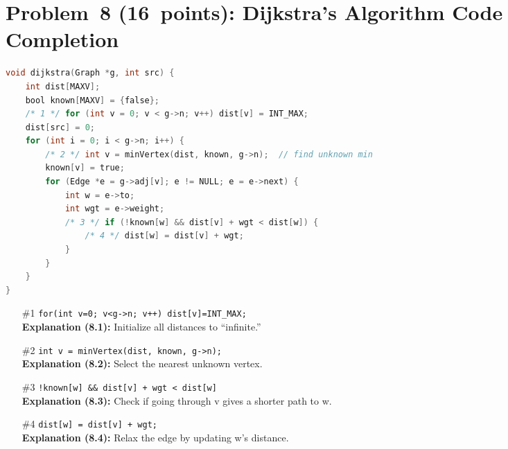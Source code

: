 \documentclass[12pt]{article}
\begin{document}
\section*{Problem 8 (16 points): Dijkstra's Algorithm Code Completion}
\begin{lstlisting}[language=C]
void dijkstra(Graph *g, int src) {
    int dist[MAXV];
    bool known[MAXV] = {false};
    /* 1 */ for (int v = 0; v < g->n; v++) dist[v] = INT_MAX;
    dist[src] = 0;
    for (int i = 0; i < g->n; i++) {
        /* 2 */ int v = minVertex(dist, known, g->n);  // find unknown min
        known[v] = true;
        for (Edge *e = g->adj[v]; e != NULL; e = e->next) {
            int w = e->to;
            int wgt = e->weight;
            /* 3 */ if (!known[w] && dist[v] + wgt < dist[w]) {
                /* 4 */ dist[w] = dist[v] + wgt;
            }
        }
    }
}
\end{lstlisting}
\begin{itemize}
  \item[\#1] \verb|for(int v=0; v<g->n; v++) dist[v]=INT_MAX;|  
    \\ \textbf{Explanation (8.1):} Initialize all distances to “infinite.”
  \item[\#2] \verb|int v = minVertex(dist, known, g->n);|  
    \\ \textbf{Explanation (8.2):} Select the nearest unknown vertex.
  \item[\#3] \verb|!known[w] && dist[v] + wgt < dist[w]|  
    \\ \textbf{Explanation (8.3):} Check if going through v gives a shorter path to w.
  \item[\#4] \verb|dist[w] = dist[v] + wgt;|  
    \\ \textbf{Explanation (8.4):} Relax the edge by updating w’s distance.
\end{itemize}
\end{document}
